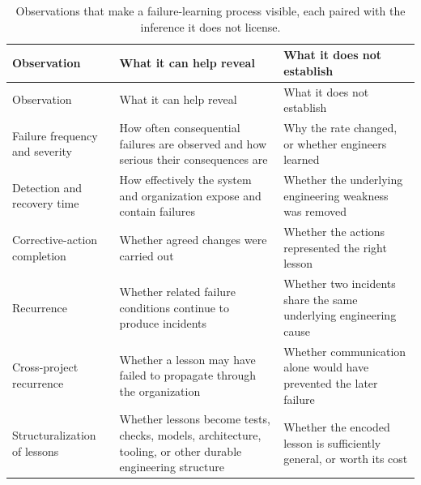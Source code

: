 \begin{longtable}[]{@{}
  >{\raggedright\arraybackslash}p{}
  >{\raggedright\arraybackslash}p{}
  >{\raggedright\arraybackslash}p{}@{}}
\caption{Observations that make a failure-learning process visible, each paired with the inference it does
not license.}\label{tbl-learning-observables}\tabularnewline
\toprule\noalign{}
\begin{minipage}[b]{\linewidth}\raggedright
Observation
\end{minipage} & \begin{minipage}[b]{\linewidth}\raggedright
What it can help reveal
\end{minipage} & \begin{minipage}[b]{\linewidth}\raggedright
What it does not establish
\end{minipage} \\
\midrule\noalign{}
\endfirsthead
\toprule\noalign{}
\begin{minipage}[b]{\linewidth}\raggedright
Observation
\end{minipage} & \begin{minipage}[b]{\linewidth}\raggedright
What it can help reveal
\end{minipage} & \begin{minipage}[b]{\linewidth}\raggedright
What it does not establish
\end{minipage} \\
\midrule\noalign{}
\endhead
\bottomrule\noalign{}
\endlastfoot
Failure frequency and severity & How often consequential failures are observed and how serious their consequences are & Why the rate changed, or whether engineers learned \\
Detection and recovery time & How effectively the system and organization expose and contain failures & Whether the underlying engineering weakness was removed \\
Corrective-action completion & Whether agreed changes were carried out & Whether the actions represented the right lesson \\
Recurrence & Whether related failure conditions continue to produce incidents & Whether two incidents share the same underlying engineering cause \\
Cross-project recurrence & Whether a lesson may have failed to propagate through the organization & Whether communication alone would have prevented the later failure \\
Structuralization of lessons & Whether lessons become tests, checks, models, architecture, tooling, or other durable engineering structure & Whether the encoded lesson is sufficiently general, or worth its cost \\
\end{longtable}

